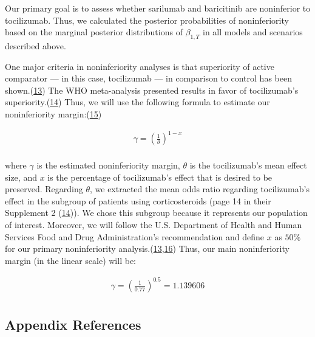 \documentclass[
  12pt,
]{article}
\begin{document}
Our primary goal is to assess whether sarilumab and baricitinib are
noninferior to tocilizumab. Thus, we calculated the posterior
probabilities of noninferiority based on the marginal posterior
distributions of \(\beta_{1, T}\) in all models and scenarios described
above.

One major criteria in noninferiority analyses is that superiority of
active comparator --- in this case, tocilizumab --- in comparison to
control has been shown.(\protect\hyperlink{ref-tsui2019}{13}) The WHO
meta-analysis presented results in favor of tocilizumab's
superiority.(\protect\hyperlink{ref-whoma}{14}) Thus, we will use the
following formula to estimate our noninferiority
margin:(\protect\hyperlink{ref-trone2020}{15})

\begin{align*}
\gamma =  \left( \frac{1}{\theta} \right)^{1 - x} \\
\end{align*}

where \(\gamma\) is the estimated noninferiority margin, \(\theta\) is
the tocilizumab's mean effect size, and \(x\) is the percentage of
tocilizumab's effect that is desired to be preserved. Regarding
\(\theta\), we extracted the mean odds ratio regarding tocilizumab's
effect in the subgroup of patients using corticosteroids (page 14 in
their Supplement 2 (\protect\hyperlink{ref-whoma}{14})). We chose this
subgroup because it represents our population of interest. Moreover, we
will follow the U.S. Department of Health and Human Services Food and
Drug Administration's recommendation and define \(x\) as \(50\%\) for
our primary noninferiority
analysis.(\protect\hyperlink{ref-tsui2019}{13},\protect\hyperlink{ref-fda}{16})
Thus, our main noninferiority margin (in the linear scale) will be:

\begin{align*}
\gamma =  \left( \frac{1}{0.77} \right)^{0.5} = 1.139606 \\
\end{align*}

\newpage

\hypertarget{appendix-references}{%
\subsection{Appendix References}\label{appendix-references}}
\end{document}
